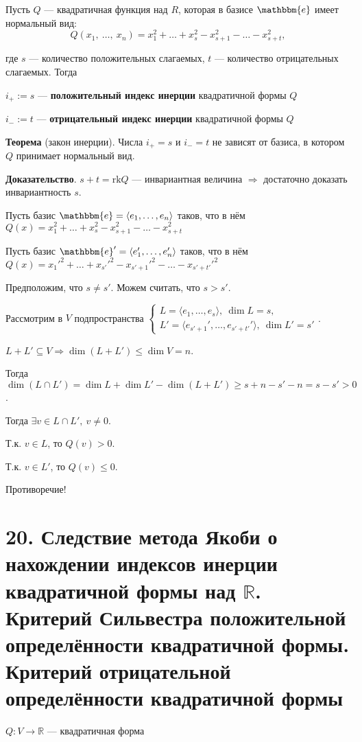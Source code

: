 \documentclass[a4paper, 12pt]{article}
\newcommand{\R}{\mathbb{R}}
\newcommand{\me}{\mathbbm{e}}
\newcommand{\rk}{\text{rk}}
\begin{document}
\vspace{7mm}
Пусть $Q$ --- квадратичная функция над $R$, которая в базисе $\me$ имеет нормальный вид:
\vspace{-3mm}
\[
Q(x_1,\ \ldots,\ x_n) = x_1^2 + \ldots + x_s^2 - x_{s + 1}^2 - \ldots - x_{s + t}^2,
\]

\vspace{-3mm}
где $s$ --- количество положительных слагаемых, $t$ --- количество отрицательных слагаемых. Тогда

$i_+ := s$ --- \textbf{положительный индекс инерции} квадратичной формы $Q$

$i_- := t$ --- \textbf{отрицательный индекс инерции} квадратичной формы $Q$

\textbf{Теорема} (закон инерции). Числа $i_+ = s$ и $i_- = t$ не зависят от базиса, в котором $Q$ принимает нормальный вид.

\textbf{Доказательство}.  $s + t = \rk Q$ --- инвариантная величина $\Rightarrow$ достаточно доказать инвариантность $s$.

Пусть базис $\me = \langle e_1, \ldots, e_n \rangle$ таков, что в нём $Q(x) = x_1^2 + \ldots + x_s^2 - x_{s + 1}^2 - \ldots - x_{s + t}^2$

Пусть базис $\me' = \langle e_1', \ldots, e_n' \rangle$ таков, что в нём $Q(x) = x_1'^2 + \ldots + x_{s'}'^2 - x_{s' + 1}'^2 - \ldots - x_{s' + t'}'^2$

Предположим, что $s \neq s'$. Можем считать, что $s > s'$.

Рассмотрим в $V$ подпространства $
\begin{cases*}
L = \langle e_1, \ldots, e_s \rangle,\ \dim L = s, \\
L' = \langle e_{s' + 1}', \ldots, e_{s' + t'}' \rangle,\ \dim L' = s'
\end{cases*}
$.

$L + L' \subseteq V \Rightarrow \dim(L + L') \leqslant \dim V = n$.

Тогда $\dim(L \cap L') = \dim L + \dim L' - \dim (L + L') \geqslant s + n - s' - n = s - s' > 0$.

Тогда $\exists v \in L \cap L',\ v \neq 0$.

Т.к. $v \in L$, то $Q(v) > 0$.

Т.к. $v \in L'$, то $Q(v) \leqslant 0$.

Противоречие!

\section*{20. Следствие метода Якоби о нахождении индексов инерции квадратичной формы над $\R$. Критерий Сильвестра положительной определённости квадратичной формы. Критерий отрицательной определённости квадратичной формы}
$Q: V \rightarrow \R$ --- квадратичная форма
\end{document}
